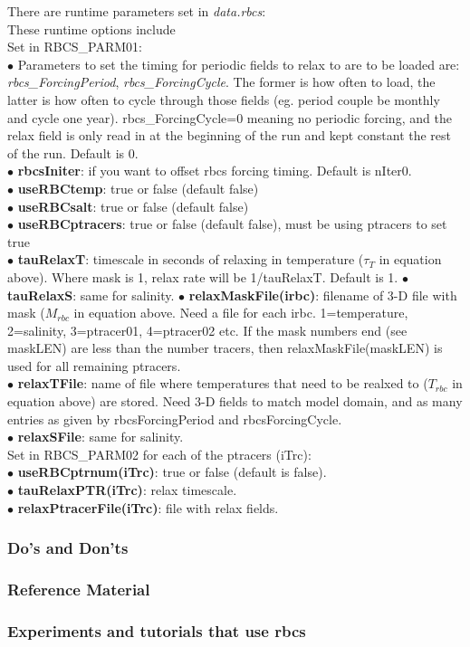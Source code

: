 \noindent
There are runtime parameters
set in {\it data.rbcs}:\\
These runtime options include\\
Set in {RBCS\_PARM01}:\\
$\bullet$ Parameters to set the timing for periodic fields to
relax to are to
be loaded are: {\it rbcs\_ForcingPeriod}, {\it rbcs\_ForcingCycle}.
The former is how often to load, the latter is how often to cycle
through those fields (eg. period couple be monthly and cycle one year).
rbcs\_ForcingCycle=0 meaning no periodic forcing, and the relax field
is only read in at the beginning of the run and kept constant
the rest of the run. Default is 0.
\\
$\bullet$  {\bf rbcsIniter}: if you want to offset rbcs forcing
timing. Default is nIter0.\\
$\bullet$  {\bf useRBCtemp}: true or false (default false)\\
$\bullet$  {\bf useRBCsalt}: true or false (default false)\\
$\bullet$  {\bf useRBCptracers}: true or false (default false), must be using
ptracers to set true\\
$\bullet$  {\bf tauRelaxT}: timescale in seconds of relaxing
in temperature ($\tau_T$ in equation above). 
Where mask is 1, relax rate will be
1/tauRelaxT. Default is 1.
$\bullet$  {\bf tauRelaxS}: same for salinity.
$\bullet$  {\bf relaxMaskFile(irbc)}: filename of 3-D file
with mask ($M_{rbc}$ in equation above. 
Need a file for each irbc. 1=temperature,
2=salinity, 3=ptracer01, 4=ptracer02 etc. If the mask numbers
end (see maskLEN) are less than the number tracers, then
relaxMaskFile(maskLEN) is used for all remaining ptracers.\\
$\bullet$  {\bf relaxTFile}: name of file where temperatures
that need to be realxed to ($T_{rbc}$ in equation above)
are stored. Need 3-D fields to
match model domain, and as many entries as given by
rbcsForcingPeriod and rbcsForcingCycle.\\
$\bullet$  {\bf relaxSFile}: same for salinity.\\

\vspace{.5cm}
\noindent
Set in {RBCS\_PARM02} for each of the ptracers (iTrc):\\
$\bullet$ {\bf useRBCptrnum(iTrc)}: true or false (default
is false).\\
$\bullet$ {\bf tauRelaxPTR(iTrc)}: relax timescale.\\
$\bullet$ {\bf relaxPtracerFile(iTrc)}: file with relax
fields.\\


\subsubsection{Do's and Don'ts}

\subsubsection{Reference Material}

\subsubsection{Experiments and tutorials that use rbcs}
\label{sec:pkg:rbcs:experiments}




